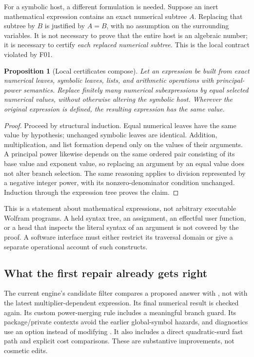 \documentclass[11pt,letterpaper]{article}
\newcommand{\code}[1]{\texttt{\detokenize{#1}}}
\newtheorem{proposition}[theorem]{Proposition}
\theoremstyle{definition}
\theoremstyle{remark}
\begin{document}
For a symbolic host, a different formulation is needed. Suppose an inert mathematical expression contains an exact numerical subtree $A$. Replacing that subtree by $B$ is justified by $A=B$, with no assumption on the surrounding variables. It is not necessary to prove that the entire host is an algebraic number; it is necessary to certify \emph{each replaced numerical subtree}. This is the local contract violated by F01.

\begin{proposition}[Local certificates compose]\label{prop:congruence}
Let an expression be built from exact numerical leaves, symbolic leaves, lists, and arithmetic operations with principal-power semantics. Replace finitely many numerical subexpressions by equal selected numerical values, without otherwise altering the symbolic host. Wherever the original expression is defined, the resulting expression has the same value.
\end{proposition}
\begin{proof}
Proceed by structural induction. Equal numerical leaves have the same value by hypothesis; unchanged symbolic leaves are identical. Addition, multiplication, and list formation depend only on the values of their arguments. A principal power likewise depends on the same ordered pair consisting of its base value and exponent value, so replacing an argument by an equal value does not alter branch selection. The same reasoning applies to division represented by a negative integer power, with its nonzero-denominator condition unchanged. Induction through the expression tree proves the claim.
\end{proof}

This is a statement about mathematical expressions, not arbitrary executable Wolfram programs. A held syntax tree, an assignment, an effectful user function, or a head that inspects the literal syntax of an argument is not covered by the proof. A software interface must either restrict its traversal domain or give a separate operational account of such constructs.

\subsection{What the first repair already gets right}

The current engine's candidate filter compares a proposed answer with \code{problem}, not with the latest multiplier-dependent expression. Its final numerical result is checked again. Its custom power-merging rule includes a meaningful branch guard. Its package/private contexts avoid the earlier global-symbol hazards, and diagnostics use an option instead of modifying \code{Print}. It also includes a direct quadratic-surd fast path and explicit cost comparisons. These are substantive improvements, not cosmetic edits.\cite{baseline,priorcorrected}
\end{document}
